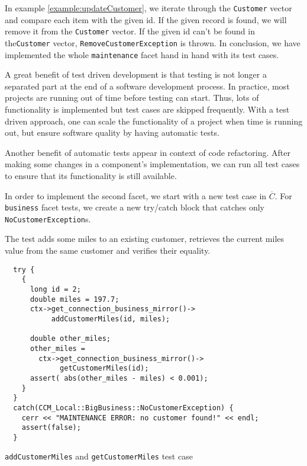 In example \ref{example:updateCustomer}, we iterate through 
the {\tt Customer} vector and compare 
each item with the given id.
If the given record is found, we will remove it from the {\tt Customer} vector.
If the given id can't be found in the{\tt Customer} vector, 
{\tt RemoveCustomerException} is thrown.
In conclusion, we have implemented the whole {\tt maintenance} facet hand in 
hand with its test cases. 

\vspace{3mm}
A great benefit of test driven development is that testing is not longer a 
separated part at the end of a software development process.
In practice, most projects are running out of time before testing can start. 
Thus, lots of functionality is implemented but test cases are skipped 
frequently.
With a test driven approach, one can scale the functionality of a project when 
time is running out, but ensure software quality by having automatic tests.

Another benefit of automatic tests appear in context of code refactoring. 
After making some changes in a component's implementation, we can run all test 
cases to ensure that its functionality is still available.


\vspace{1cm}
In order to implement the second facet, we start with a new test case in 
$\overline{C}$.
For {\tt business} facet tests, we create a new try/catch block that catches
only {\tt NoCustomerException}s.
 
The test adds some miles to an existing customer, retrieves the current miles 
value from the same customer and verifies their equality. 
\begin{Example}
\begin{minifbox}
\begin{small}
\begin{verbatim}
  try {
    {
      long id = 2;
      double miles = 197.7;
      ctx->get_connection_business_mirror()->
           addCustomerMiles(id, miles); 

      double other_miles;
      other_miles = 
        ctx->get_connection_business_mirror()->
             getCustomerMiles(id); 
      assert( abs(other_miles - miles) < 0.001);
    }
  }
  catch(CCM_Local::BigBusiness::NoCustomerException) {
    cerr << "MAINTENANCE ERROR: no customer found!" << endl;
    assert(false);
  }
\end{verbatim}
\end{small}
\end{minifbox}
\caption{{\tt addCustomerMiles} and {\tt getCustomerMiles} test case}
\label{example:}
\end{Example}


